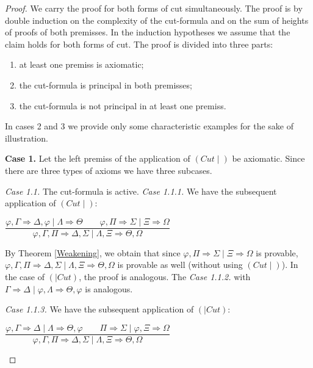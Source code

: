 \documentclass[10pt,a4paper]{article}
\theoremstyle{definition}
\newcommand{\3}{\vspace{.3in}}
\newcommand{\2}{\vspace{.2in}}
\newcommand{\1}{\vspace{.1in}}
\newcommand{\5}{\vspace{.05in}}
\begin{document}
\begin{proof} We carry the proof for both forms of cut simultaneously. The proof is by 
	double induction on the complexity of the cut-formula and on the
	sum of heights of proofs of both premisses. In the induction hypotheses we assume that the claim holds for
	both forms of cut. The proof is divided into three parts: 
\begin{enumerate}\itemsep=0pt
\item at least one premiss is axiomatic;
\item the cut-formula is principal in both premisses;
\item the cut-formula is not principal in at least one premiss.
\end{enumerate}

In cases 2 and 3 we provide only some characteristic examples for the sake of illustration.

\1

\textbf{Case 1.} Let the left premiss of the application of $ (Cut\mid) $ be axiomatic. Since there are three types of axioms we have three subcases. 

\textit{Case 1.1.} The cut-formula is active. \textit{Case 1.1.1.} We have the subsequent application of  $ (Cut\mid) $:
\begin{center}
	$\dfrac{\varphi,\Gamma 
	\Rightarrow  \Delta, \varphi \mid \Lambda\Rightarrow\Theta \qquad
	\varphi, \Pi  \Rightarrow  \Sigma \mid \Xi\Rightarrow\Omega} {\varphi,\Gamma, \Pi  \Rightarrow  \Delta, \Sigma \mid \Lambda, \Xi\Rightarrow\Theta, \Omega}$
\end{center}

By Theorem \ref{Weakening}, we obtain that since $ \varphi, \Pi  \Rightarrow  \Sigma \mid \Xi\Rightarrow\Omega $ is provable, 
 $ \varphi,\Gamma, \Pi  \Rightarrow  \Delta, \Sigma \mid \Lambda, \Xi\Rightarrow\Theta, \Omega $ is provable as well (without using $ (Cut\mid) $). In the case of $ (\mid Cut) $, the proof is analogous. The \textit{Case 1.1.2.} with $\Gamma 
 \Rightarrow  \Delta \mid \varphi, \Lambda\Rightarrow\Theta, \varphi$ is analogous. 

\textit{Case 1.1.3.} We have the subsequent application of  $ (\mid Cut) $:
\begin{center}
	$\dfrac{\varphi,\Gamma 
	\Rightarrow  \Delta \mid \Lambda\Rightarrow\Theta, \varphi \qquad
	 \Pi  \Rightarrow  \Sigma \mid \varphi,\Xi\Rightarrow\Omega} {\varphi,\Gamma, \Pi  \Rightarrow  \Delta, \Sigma \mid \Lambda, \Xi\Rightarrow\Theta, \Omega}$
\end{center}


\end{proof}
\end{document}
